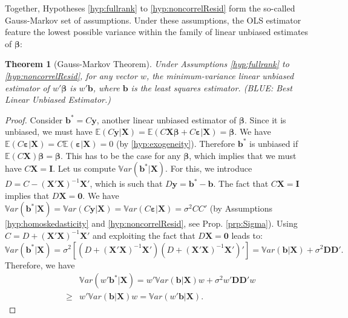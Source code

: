 \documentclass[
  12pt,
]{book}
\newtheorem{theorem}{Theorem}[chapter]
\theoremstyle{definition}
\theoremstyle{definition}
\theoremstyle{definition}
\theoremstyle{definition}
\theoremstyle{remark}
\begin{document}
Together, Hypotheses \ref{hyp:fullrank} to \ref{hyp:noncorrelResid} form the so-called Gauss-Markov set of assumptions. Under these assumptions, the OLS estimator feature the lowest possible variance within the family of linear unbiased estimates of \(\boldsymbol\beta\):

\begin{theorem}[Gauss-Markov Theorem]
\protect\hypertarget{thm:GaussMarkov}{}\label{thm:GaussMarkov}Under Assumptions \ref{hyp:fullrank} to \ref{hyp:noncorrelResid}, for any vector \(w\), the minimum-variance linear unbiased estimator of \(w' \boldsymbol\beta\) is \(w' \mathbf{b}\), where \(\mathbf{b}\) is the least squares estimator. (BLUE: Best Linear Unbiased Estimator.)
\end{theorem}

\begin{proof}
Consider \(\mathbf{b}^* = C \mathbf{y}\), another linear unbiased estimator of \(\boldsymbol\beta\). Since it is unbiased, we must have \(\mathbb{E}(C\mathbf{y}|\mathbf{X}) = \mathbb{E}(C\mathbf{X}\boldsymbol\beta + C\boldsymbol\varepsilon|\mathbf{X}) = \boldsymbol\beta\). We have \(\mathbb{E}(C\boldsymbol\varepsilon|\mathbf{X})=C\mathbb{E}(\boldsymbol\varepsilon|\mathbf{X})=0\) (by \ref{hyp:exogeneity}). Therefore \(\mathbf{b}^*\) is unbiased if \(\mathbb{E}(C\mathbf{X})\boldsymbol\beta=\boldsymbol\beta\). This has to be the case for any \(\boldsymbol\beta\), which implies that we must have \(C\mathbf{X}=\mathbf{I}\). Let us compute \(\mathbb{V}ar(\mathbf{b^*}|\mathbf{X})\). For this, we introduce \(D = C - (\mathbf{X}'\mathbf{X})^{-1}\mathbf{X}'\), which is such that \(D\mathbf{y}=\mathbf{b}^*-\mathbf{b}\). The fact that \(C\mathbf{X}=\mathbf{I}\) implies that \(D\mathbf{X} = \mathbf{0}\). We have \(\mathbb{V}ar(\mathbf{b^*}|\mathbf{X}) = \mathbb{V}ar(C \mathbf{y}|\mathbf{X}) =\mathbb{V}ar(C \boldsymbol\varepsilon|\mathbf{X}) = \sigma^2CC'\) (by Assumptions \ref{hyp:homoskedasticity} and \ref{hyp:noncorrelResid}, see Prop. \ref{prp:Sigma}). Using \(C=D+(\mathbf{X}'\mathbf{X})^{-1}\mathbf{X}'\) and exploiting the fact that \(D\mathbf{X} = \mathbf{0}\) leads to:
\[
\mathbb{V}ar(\mathbf{b^*}|\mathbf{X}) =\sigma^2\left[(D+(\mathbf{X}'\mathbf{X})^{-1}\mathbf{X}')(D+(\mathbf{X}'\mathbf{X})^{-1}\mathbf{X}')'\right] = \mathbb{V}ar(\mathbf{b}|\mathbf{X}) + \sigma^2 \mathbf{D}\mathbf{D}'.
\]
Therefore, we have
\begin{eqnarray*}
&&\mathbb{V}ar(w'\mathbf{b^*}|\mathbf{X})=w'\mathbb{V}ar(\mathbf{b}|\mathbf{X})w + \sigma^2 w'\mathbf{D}\mathbf{D}'w\\
&\ge& w'\mathbb{V}ar(\mathbf{b}|\mathbf{X})w=\mathbb{V}ar(w'\mathbf{b}|\mathbf{X}).
\end{eqnarray*}
\end{proof}
\end{document}
